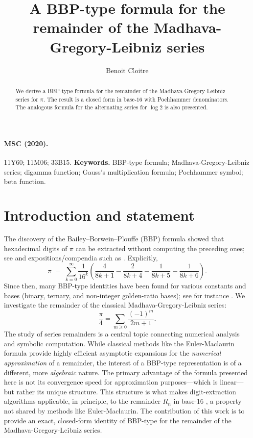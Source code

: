 \documentclass[11pt]{article}
\title{A BBP-type formula for the remainder of the  Madhava-Gregory-Leibniz series}
\author{Benoit Cloitre}
\date{}
\numberwithin{equation}{section}
\theoremstyle{plain}
\begin{document}
\maketitle
\begin{abstract}
We derive a BBP-type formula for the remainder of the Madhava-Gregory-Leibniz
series for $\pi$. The result is a closed form in base-$16$ with
Pochhammer denominators. The analogous formula for the alternating series for $\log 2$ is also presented.
\end{abstract}

\paragraph{MSC (2020).} 11Y60; 11M06; 33B15. \quad
\textbf{Keywords.} BBP-type formula; Madhava-Gregory-Leibniz series; digamma function; Gauss's multiplication formula; Pochhammer symbol; beta function.

\section{Introduction and statement}

The discovery of the Bailey–Borwein–Plouffe (BBP) formula showed
that hexadecimal digits of $\pi$ can be extracted without computing
the preceding ones; see \cite{BBP1997} and expositions/compendia
such as \cite{BaileyCompendium,MathWorldBBP,MathWorldPiFormulas}.
Explicitly, 
\[
\pi\;=\;\sum_{k=0}^{\infty}\frac{1}{16^{k}}\!\left(\frac{4}{8k+1}-\frac{2}{8k+4}-\frac{1}{8k+5}-\frac{1}{8k+6}\right).
\]
Since then, many BBP-type identities have been found for various constants
and bases (binary, ternary, and non-integer golden-ratio bases); see
for instance \cite{Chan2009,AdegokeLafont,KristensenMathiasen}. We investigate the remainder of the classical Madhava-Gregory-Leibniz series: 
\[
\frac{\pi}{4}=\sum_{m\ge0}\frac{(-1)^{m}}{2m+1}.
\]
The study of series remainders is a central topic connecting numerical analysis and symbolic computation. While classical methods like the Euler-Maclaurin formula provide highly efficient asymptotic expansions for the \emph{numerical approximation} of a remainder, the interest of a BBP-type representation is of a different, more \emph{algebraic} nature. The primary advantage of the formula presented here is not its convergence speed for approximation purposes—which is linear—but rather its unique structure. This structure is what makes digit-extraction algorithms applicable, in principle, to the remainder $R_n$ in base-16 \cite{BBP1997}, a property not shared by methods like Euler-Maclaurin. The contribution of this work is to provide an exact, closed-form identity of BBP-type for the remainder of the Madhava-Gregory-Leibniz series.
\end{document}
